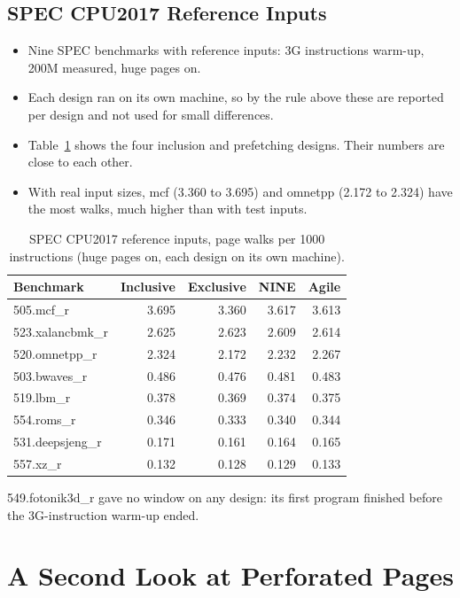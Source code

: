 \subsection{SPEC CPU2017 Reference Inputs}
\begin{itemize}
    \item Nine SPEC benchmarks with reference inputs: 3G instructions warm-up, 200M measured, huge pages on.
    \item Each design ran on its own machine, so by the rule above these are reported per design and not used for small differences.
    \item Table~\ref{tab:ref} shows the four inclusion and prefetching designs. Their numbers are close to each other.
    \item With real input sizes, mcf (3.360 to 3.695) and omnetpp (2.172 to 2.324) have the most walks, much higher than with test inputs.
\end{itemize}

\begin{table}[htbp]
\centering
\small
\caption{SPEC CPU2017 reference inputs, page walks per 1000 instructions (huge pages on, each design on its own machine).}
\label{tab:ref}
\begin{tabular}{l r r r r}
\toprule
\textbf{Benchmark} & \textbf{Inclusive} & \textbf{Exclusive} & \textbf{NINE} & \textbf{Agile} \\
\midrule
505.mcf\_r & 3.695 & 3.360 & 3.617 & 3.613 \\
523.xalancbmk\_r & 2.625 & 2.623 & 2.609 & 2.614 \\
520.omnetpp\_r & 2.324 & 2.172 & 2.232 & 2.267 \\
503.bwaves\_r & 0.486 & 0.476 & 0.481 & 0.483 \\
519.lbm\_r & 0.378 & 0.369 & 0.374 & 0.375 \\
554.roms\_r & 0.346 & 0.333 & 0.340 & 0.344 \\
531.deepsjeng\_r & 0.171 & 0.161 & 0.164 & 0.165 \\
557.xz\_r & 0.132 & 0.128 & 0.129 & 0.133 \\
\bottomrule
\end{tabular}
\end{table}

\noindent 549.fotonik3d\_r gave no window on any design: its first program finished before the 3G-instruction warm-up ended.

\section{A Second Look at Perforated Pages}
\label{sec:perf_strict}

